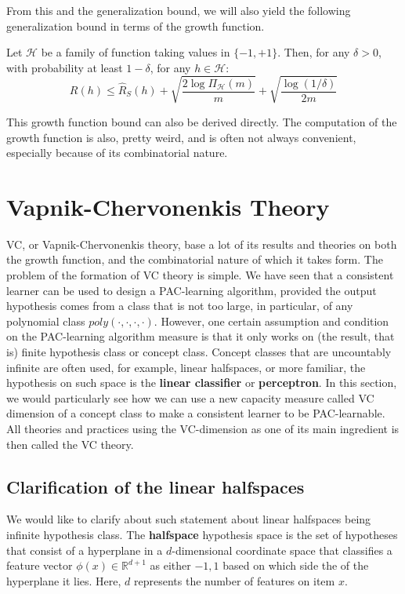 From this and the generalization bound, we will also yield the following generalization bound in terms of the growth function. 
\begin{col}
    Let $\mathcal{H}$ be a family of function taking values in $\{-1,+1\}$. Then, for any $\delta > 0$, with probability at least $1-\delta$, for any $h\in \mathcal{H}$: 
    \begin{equation}
        R(h) \leq \hat{R}_{S}(h) + \sqrt{\frac{2\log{\Pi_{\mathcal{H}}(m)}}{m}} + \sqrt{\frac{\log{(1/\delta)}}{2m}}
    \end{equation}
\end{col}
This growth function bound can also be derived directly. The computation of the growth function is also, pretty weird, and is often not always convenient, especially because of its combinatorial nature. 

\section{Vapnik-Chervonenkis Theory}

VC, or Vapnik-Chervonenkis theory, base a lot of its results and theories on both the growth function, and the combinatorial nature of which it takes form. The problem of the formation of VC theory is simple. We have seen that a consistent learner can be used to design a PAC-learning algorithm, provided the output hypothesis comes from a class that is not too large, in particular, of any polynomial class $poly(\cdot,\cdot,\cdot,\cdot)$. However, one certain assumption and condition on the PAC-learning algorithm measure is that it only works on (the result, that is) finite hypothesis class or concept class. Concept classes that are uncountably infinite are often used, for example, linear halfspaces, or more familiar, the hypothesis on such space is the \textbf{linear classifier} or \textbf{perceptron}. In this section, we would particularly see how we can use a new capacity measure called VC dimension of a concept class to make a consistent learner to be PAC-learnable. All theories and practices using the VC-dimension as one of its main ingredient is then called the VC theory. 
\subsection{Clarification {\small of the linear halfspaces}}

We would like to clarify about such statement about linear halfspaces being infinite hypothesis class. The \textbf{halfspace}  hypothesis space is the set of hypotheses that consist of a hyperplane in a $d$-dimensional coordinate space that classifies a feature vector $\phi(x)\in \mathbb{R}^{d+1}$ as either $-1,1$ based on which side the of the hyperplane it lies. Here, $d$ represents the number of features on item $x$. 

